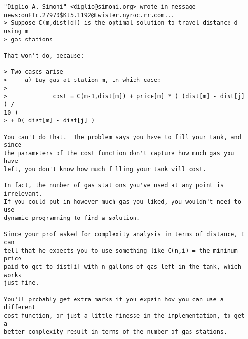 \begin{verbatim}
"Diglio A. Simoni" <diglio@simoni.org> wrote in message
news:ouFTc.27970$Kt5.1192@twister.nyroc.rr.com...
> Suppose C(m,dist[d]) is the optimal solution to travel distance d using m
> gas stations

That won't do, because:

> Two cases arise
>     a) Buy gas at station m, in which case:
>
>             cost = C(m-1,dist[m]) + price[m] * ( (dist[m] - dist[j] ) /
10 )
> + D( dist[m] - dist[j] )

You can't do that.  The problem says you have to fill your tank, and since
the parameters of the cost function don't capture how much gas you have
left, you don't know how much filling your tank will cost.

In fact, the number of gas stations you've used at any point is irrelevant.
If you could put in however much gas you liked, you wouldn't need to use
dynamic programming to find a solution.

Since your prof asked for complexity analysis in terms of distance, I can
tell that he expects you to use something like C(n,i) = the minimum price
paid to get to dist[i] with n gallons of gas left in the tank, which works
just fine.

You'll probably get extra marks if you expain how you can use a different
cost function, or just a little finesse in the implementation, to get a
better complexity result in terms of the number of gas stations.
\end{verbatim}
